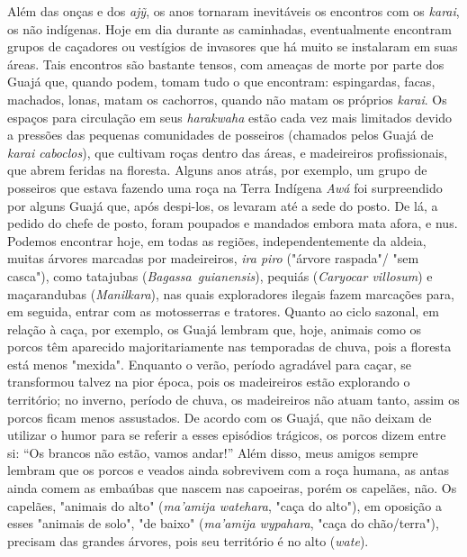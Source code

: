 Além das onças e dos \emph{ajỹ}, os anos tornaram inevitáveis os
encontros com os \emph{karai}, os não indígenas. Hoje em dia durante as
caminhadas, eventualmente encontram grupos de caçadores ou vestígios de
invasores que há muito se instalaram em suas áreas. Tais encontros são
bastante tensos, com ameaças de morte por parte dos Guajá que, quando
podem, tomam tudo o que encontram: espingardas, facas, machados, lonas,
matam os cachorros, quando não matam os próprios \emph{karai}. Os
espaços para circulação em seus \emph{harakwaha} estão cada vez mais
limitados devido a pressões das pequenas comunidades de posseiros
(chamados pelos Guajá de \emph{karai caboclos}), que cultivam roças
dentro das áreas, e madeireiros profissionais, que abrem feridas na
floresta. Alguns anos atrás, por exemplo, um grupo de posseiros que
estava fazendo uma roça na Terra Indígena \emph{Awá} foi surpreendido
por alguns Guajá que, após despi-los, os levaram até a sede do posto. De
lá, a pedido do chefe de posto, foram poupados e mandados embora mata
afora, e nus. Podemos encontrar hoje, em todas as regiões,
independentemente da aldeia, muitas árvores marcadas por madeireiros,
\emph{ira piro} ("árvore raspada"/ "sem casca"), como tatajubas
(\emph{Bagassa~guianensis}), pequiás (\emph{Caryocar villosum}) e
maçarandubas (\emph{Manilkara}), nas quais exploradores ilegais fazem
marcações para, em seguida, entrar com as motosserras e tratores. Quanto
ao ciclo sazonal, em relação à caça, por exemplo, os Guajá lembram que,
hoje, animais como os porcos têm aparecido majoritariamente nas
temporadas de chuva, pois a floresta está menos "mexida". Enquanto o
verão, período agradável para caçar, se transformou talvez na pior
época, pois os madeireiros estão explorando o território; no inverno,
período de chuva, os madeireiros não atuam tanto, assim os porcos ficam
menos assustados. De acordo com os Guajá, que não deixam de utilizar o
humor para se referir a esses episódios trágicos, os porcos dizem entre
si: ``Os brancos não estão, vamos andar!'' Além disso, meus amigos
sempre lembram que os porcos e veados ainda sobrevivem com a roça
humana, as antas ainda comem as embaúbas que nascem nas capoeiras, porém
os capelães, não. Os capelães, "animais do alto" (\emph{ma'amija
watehara}, "caça do alto"), em oposição a esses "animais de solo", "de
baixo" (\emph{ma'amija} \emph{wypahara}, "caça do chão/terra"), precisam
das grandes árvores, pois seu território é no alto (\emph{wate}).

